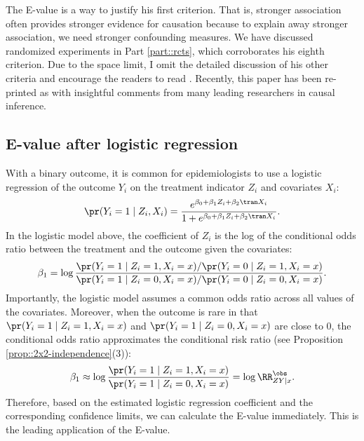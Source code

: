 The E-value is a way to justify his first criterion. 
That is, stronger association often provides stronger evidence for causation because to explain away stronger association, we need stronger confounding measures. 
We have discussed randomized experiments in Part \ref{part::rcts}, which corroborates his eighth criterion. Due to the space limit, I omit the detailed discussion of his other criteria and encourage the readers to read  \citet{hill1965environment}. Recently, this paper has been re-printed as \citet{hill2020environment} with insightful comments from many leading researchers in causal inference. 




\subsection{E-value after logistic regression}

With a binary outcome, it is common for epidemiologists to use a logistic regression of the outcome $Y_i$ on the treatment indicator $Z_i$ and covariates $X_i$:
$$
\pr(Y_i = 1\mid Z_i, X_i) = \frac{  e^{\beta_0 + \beta_1 Z_i + \beta_2\tran X_i}  }{1  + e^{\beta_0 + \beta_1 Z_i + \beta_2\tran X_i}} .
$$
In the logistic model above, the coefficient of $Z_i$ is the log of the conditional odds ratio between the treatment and the outcome given the covariates:
$$
\beta_1 = \log \frac{   \pr(Y_i=1\mid Z_i =1, X_i=x)/  \pr(Y_i=0\mid Z_i =1, X_i=x)  }
{  \pr(Y_i=1\mid Z_i =0, X_i=x)/  \pr(Y_i=0\mid Z_i =0, X_i=x)  }  .
$$
Importantly, the logistic model assumes a common odds ratio across all values of the covariates. Moreover, when the outcome is rare in that $ \pr(Y_i=1\mid Z_i =1, X_i=x)$ and $\pr(Y_i=1\mid Z_i =0, X_i=x)$ are close to $0$, the conditional odds ratio approximates the conditional risk ratio (see Proposition \ref{prop::2x2-independence}(3)):
$$
\beta_1  \approx \log  \frac{   \pr(Y_i=1\mid Z_i =1, X_i=x)  }
{  \pr(Y_i=1\mid Z_i =0, X_i=x)  } = \log   \RR_{ZY\mid x}^\obs.
$$
Therefore, based on the estimated logistic regression coefficient and the corresponding confidence limits, we can calculate the E-value immediately. This is the leading application of the E-value. 





